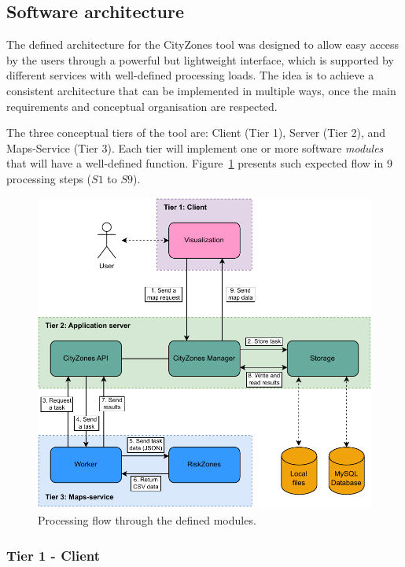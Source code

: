 \begin{refsection}
\subsection{Software architecture}

The defined architecture for the CityZones tool was designed to allow easy access by the users through a powerful but lightweight interface, which is supported by different services with well-defined processing loads. The idea is to achieve a consistent architecture that can be implemented in multiple ways, once the main requirements and conceptual organisation are respected.

The three conceptual tiers of the tool are: Client (Tier 1), Server (Tier 2), and Maps-Service (Tier 3). Each tier will implement one or more software \textit{modules} that will have a well-defined function. Figure~\ref{fig:flow} presents such expected flow in 9 processing steps ($S1$ to $S9$).

\begin{figure}[htb]
  \centering
  \includegraphics[width=\linewidth]{Chapters/4-CityZones/img/fluxograma_webapp.pdf}
  \caption{Processing flow through the defined modules.}\label{fig:flow}
\end{figure}

\subsubsection{Tier 1 - Client}


\end{refsection}
